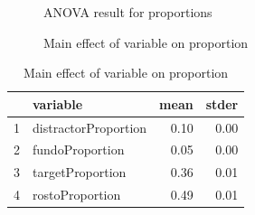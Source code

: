 \documentclass{article}
\begin{document}
\begin{figure}[H]
  \caption{ANOVA result for proportions}
  \noindent{}
  \centering
\end{figure}

\begin{figure}[H]
  \caption{Main effect of variable on proportion}
  \noindent{}
  \centering
\end{figure}

\begin{table}[ht]
\centering
\caption{Main effect of variable on proportion}
\begin{tabular}{rlrr}
  \hline
 & variable & mean & stder \\ 
  \hline
1 & distractorProportion & 0.10 & 0.00 \\ 
  2 & fundoProportion & 0.05 & 0.00 \\ 
  3 & targetProportion & 0.36 & 0.01 \\ 
  4 & rostoProportion & 0.49 & 0.01 \\ 
   \hline
\end{tabular}
\end{table}
\end{document}
